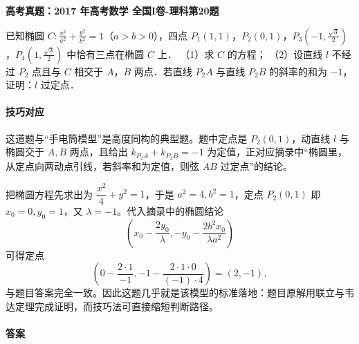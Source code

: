 \documentclass[UTF8,a4paper,11pt]{ctexart}
\newenvironment{gaokao}[1]{\par\medskip\noindent\textbf{高考真题：#1}\par\smallskip}{\par\medskip}
\begin{document}
\begin{gaokao}{2017 年高考数学 全国I卷-理科第20题}

已知椭圆 $C:\frac{x^2}{a^2}+\frac{y^2}{b^2}=1$（$a>b>0$），四点 $P_1(1,1)$，$P_2(0,1)$，$P_3(-1,\frac{\sqrt{3}}{2})$，$P_4(1,\frac{\sqrt{3}}{2})$ 中恰有三点在椭圆 $C$ 上．
（1）求 $C$ 的方程；
（2）设直线 $l$ 不经过 $P_2$ 点且与 $C$ 相交于 $A$，$B$ 两点．若直线 $P_2A$ 与直线 $P_2B$ 的斜率的和为 $-1$，证明：$l$ 过定点．

\begin{center}


\end{center}

\paragraph{技巧对应}

这道题与“手电筒模型”是高度同构的典型题。题中定点是 $P_2(0,1)$，动直线 $l$ 与椭圆交于 $A,B$ 两点，且给出 $k_{P_2A}+k_{P_2B}=-1$ 为定值，正对应摘录中“椭圆里，从定点向两动点引线，若斜率和为定值，则弦 $AB$ 过定点”的结论。

把椭圆方程先求出为 $\dfrac{x^2}{4}+y^2=1$，于是 $a^2=4,b^2=1$，定点 $P_2(0,1)$ 即 $x_0=0,y_0=1$，又 $\lambda=-1$。代入摘录中的椭圆结论
\[
\left(x_0-\frac{2y_0}{\lambda},-y_0-\frac{2b^2x_0}{\lambda a^2}\right)
\]
可得定点
\[
\left(0-\frac{2\cdot 1}{-1},-1-\frac{2\cdot 1\cdot 0}{(-1)\cdot 4}\right)=(2,-1),
\]
与题目答案完全一致。因此这题几乎就是该模型的标准落地：题目原解用联立与韦达定理完成证明，而技巧法可直接缩短判断路径。

\paragraph{答案}


\end{gaokao}
\end{document}
